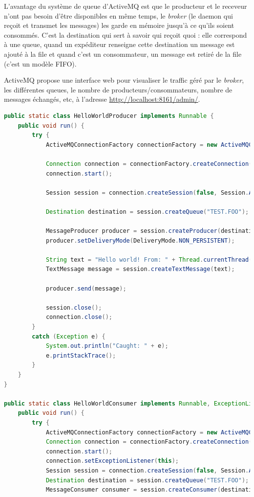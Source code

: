 L'avantage du système de queue d'ActiveMQ est que le producteur et le receveur n'ont pas besoin d'être disponibles en même temps, le \textit{broker} (le daemon qui reçoit et  transmet les messages) les garde en mémoire jusqu'à ce qu'ils soient consommés. C'est la destination qui sert à savoir qui reçoit quoi : elle correspond à une queue, quand un expéditeur renseigne cette destination un message est ajouté à la file et quand c'est un consommateur, un message est retiré de la file (c'est un modèle FIFO).

ActiveMQ propose une interface web pour visualiser le traffic géré par le \textit{broker}, les différentes queues, le nombre de producteurs/consommateurs, nombre de messages échangés, etc, à l'adresse \url{http://localhost:8161/admin/}.

\begin{minipage}{\linewidth}
	\begin{lstlisting}[language=Java, caption="Un exemple écourté d'échange de messages \textit{via} ActiveMQ", label={lst:activemqex}]
  public static class HelloWorldProducer implements Runnable {
    public void run() {
        try {
            ActiveMQConnectionFactory connectionFactory = new ActiveMQConnectionFactory("vm://localhost");

            Connection connection = connectionFactory.createConnection();
            connection.start();

            Session session = connection.createSession(false, Session.AUTO_ACKNOWLEDGE);

            Destination destination = session.createQueue("TEST.FOO");

            MessageProducer producer = session.createProducer(destination);
            producer.setDeliveryMode(DeliveryMode.NON_PERSISTENT);

            String text = "Hello world! From: " + Thread.currentThread().getName() + " : " + this.hashCode();
            TextMessage message = session.createTextMessage(text);

            producer.send(message);

            session.close();
            connection.close();
        }
        catch (Exception e) {
            System.out.println("Caught: " + e);
            e.printStackTrace();
        }
    }
}

public static class HelloWorldConsumer implements Runnable, ExceptionListener {
    public void run() {
        try {
            ActiveMQConnectionFactory connectionFactory = new ActiveMQConnectionFactory("vm://localhost");
            Connection connection = connectionFactory.createConnection();
            connection.start();
            connection.setExceptionListener(this);
            Session session = connection.createSession(false, Session.AUTO_ACKNOWLEDGE);
            Destination destination = session.createQueue("TEST.FOO");
            MessageConsumer consumer = session.createConsumer(destination);


\end{lstlisting}
\end{minipage}
